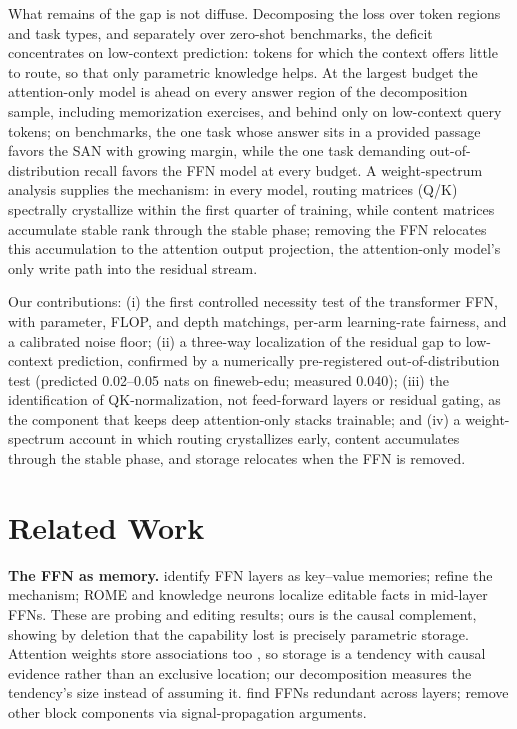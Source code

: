 \documentclass[letterpaper]{article} %
\begin{document}
What remains of the gap is not diffuse. Decomposing the loss over token
regions and task types, and separately over zero-shot benchmarks, the
deficit concentrates on low-context prediction: tokens for which the
context offers little to route, so that only parametric knowledge helps.
At the largest budget the attention-only model is ahead on every answer
region of the decomposition sample, including memorization exercises, and
behind only on low-context query tokens; on benchmarks, the one task whose
answer sits in
a provided passage favors the SAN with growing margin, while the one task
demanding out-of-distribution recall favors the FFN model at every budget.
A weight-spectrum analysis supplies the mechanism: in every model, routing
matrices (Q/K) spectrally crystallize within the first quarter of
training, while content matrices accumulate stable rank through the
stable phase; removing the FFN relocates this accumulation to the
attention output projection, the attention-only model's only write path
into the residual stream.

Our contributions: (i) the first controlled necessity test of the
transformer FFN, with parameter, FLOP, and depth matchings, per-arm
learning-rate fairness, and a calibrated noise floor; (ii) a three-way
localization of the residual gap to low-context prediction, confirmed by a
numerically pre-registered out-of-distribution test (predicted 0.02--0.05
nats on fineweb-edu; measured 0.040); (iii) the identification of
QK-normalization, not feed-forward layers or residual gating, as the
component that keeps deep attention-only stacks trainable; and (iv) a
weight-spectrum account in which routing crystallizes early, content
accumulates through the stable phase, and storage relocates when the FFN
is removed.

\section{Related Work}

\textbf{The FFN as memory.} \citet{geva2021transformer} identify FFN
layers as key--value memories; \citet{geva2022transformer} refine the
mechanism; ROME \citep{meng2022locating} and knowledge neurons
\citep{dai2022knowledge} localize editable facts in mid-layer FFNs. These
are probing and editing results; ours is the causal complement, showing by
deletion that the capability lost is precisely parametric storage.
Attention weights store associations too \citep{elhage2021mathematical},
so storage is a tendency with causal evidence rather than an exclusive
location; our decomposition measures the tendency's size instead of
assuming it.
\citet{pires2023one} find FFNs redundant across layers;
\citet{he2024simplifying} remove other block components via
signal-propagation arguments.
\end{document}
